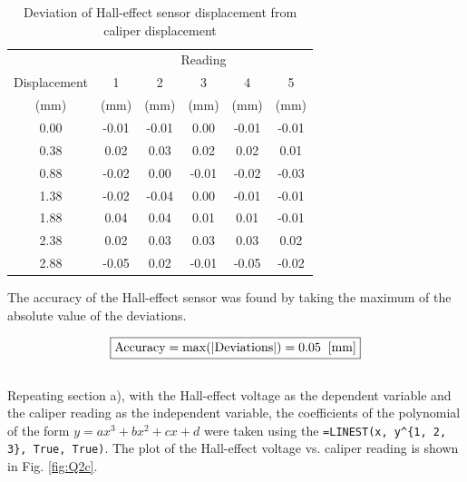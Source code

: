 \begin{table}[h]
    \centering
    \caption{Deviation of Hall-effect sensor displacement from caliper displacement}
    \label{tab:Q2b}
    \begin{tabular}{cccccc}
        \hline
         & \multicolumn{5}{c}{Reading} \\
        \cline{2-6}
        Displacement & 1 & 2 & 3 & 4 & 5 \\
        \midrule
        (mm) & (mm) & (mm) & (mm) & (mm) & (mm) \\
        \midrule
        0.00 & -0.01 & -0.01 & 0.00 & -0.01 & -0.01 \\
        0.38 & 0.02 & 0.03 & 0.02 & 0.02 & 0.01 \\
        0.88 & -0.02 & 0.00 & -0.01 & -0.02 & -0.03 \\
        1.38 & -0.02 & -0.04 & 0.00 & -0.01 & -0.01 \\
        1.88 & 0.04 & 0.04 & 0.01 & 0.01 & -0.01 \\
        2.38 & 0.02 & 0.03 & 0.03 & 0.03 & 0.02 \\
        2.88 & -0.05 & 0.02 & -0.01 & -0.05 & -0.02 \\
        \hline
    \end{tabular}
\end{table}

The accuracy of the Hall-effect sensor was found by taking the maximum of the absolute value of the deviations. 

\[
    \boxed{\text{Accuracy} = \max(|\text{Deviations}|) = 0.05 \;\; [\si[]{mm}]} 
\]

\FloatBarrier
\subsection{}

Repeating section a), with the Hall-effect voltage as the dependent variable and the caliper reading as the independent variable,
the coefficients of the polynomial of the form $y = ax^3 + bx^2 + cx + d$ were taken using the \texttt{=LINEST(x, y\string^\{1, 2, 3\}, True, True)}.
The plot of the Hall-effect voltage vs. caliper reading is shown in Fig. \ref{fig:Q2c}.

